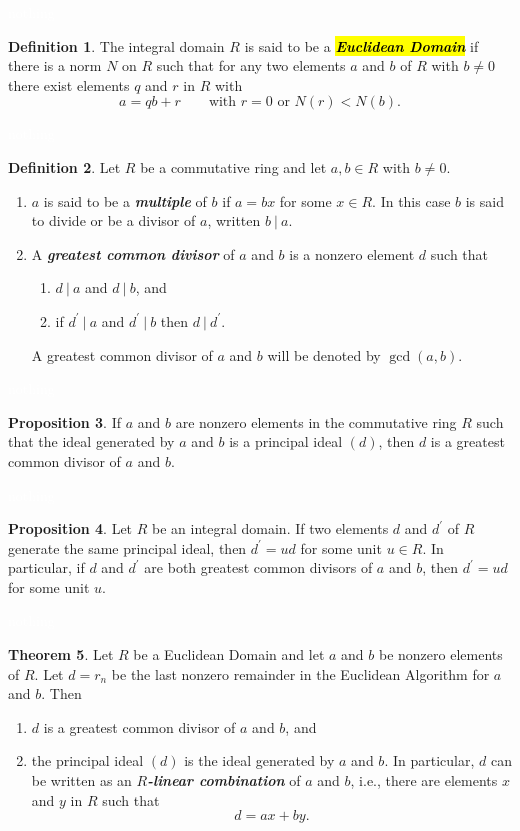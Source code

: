 \documentclass{article}
\theoremstyle{definition}
\newtheorem{thm}{Theorem}[section]
\newtheorem{prop}[thm]{Proposition}
\newtheorem{defn}[thm]{Definition}
\newcommand{\nl}{\textcolor{white}{nothing}}
\newcommand{\p}{\prime}
\begin{document}
\nl

\begin{defn}
The integral domain $R$ is said to be a \hl{\textit{\textbf{Euclidean Domain}}} if there is a norm $N$ on $R$ such that for any two elements $a$ and $b$ of $R$ with $b\neq 0$ there exist elements $q$ and $r$ in $R$ with 
\[a = qb + r\qquad \text{with } r = 0 \text{ or } N(r)<N(b).\]
\end{defn}

\nl

\begin{defn}
Let $R$ be a commutative ring and let $a,b\in R$ with $b\neq 0$.
\begin{enumerate}
\item $a$ is said to be a \textbf{\textit{multiple}} of $b$ if $a = bx$ for some $x\in R$. In this case $b$ is said to divide or be a divisor of $a$, written $b\ |\ a$.
\item A \textbf{\textit{greatest common divisor}} of $a$ and $b$ is a nonzero element $d$ such that 
\begin{enumerate}
\item $d\ |\ a$ and $d\ |\ b$, and 
\item if $d^\p\ |\ a$ and $d^\p\ |\ b$ then $d\ |\ d^\p$.
\end{enumerate}
A greatest common divisor of $a$ and $b$ will be denoted by $\gcd(a,b)$.
\end{enumerate}
\end{defn}

\nl

\begin{prop}
If $a$ and $b$ are nonzero elements in the commutative ring $R$ such that the ideal generated by $a$ and $b$ is a principal ideal $(d)$, then $d$ is a greatest common divisor of $a$ and $b$.
\end{prop}

\nl

\begin{prop}
Let $R$ be an integral domain. If two elements $d$ and $d^\p$ of $R$ generate the same principal ideal, then $d^\p = ud$ for some unit $u\in R$. In particular, if $d$ and $d^\p$ are both greatest common divisors of $a$ and $b$, then $d^\p = ud$ for some unit $u$.
\end{prop}

\nl

\begin{thm}
Let $R$ be a Euclidean Domain and let $a$ and $b$ be nonzero elements of $R$. Let $d = r_n$ be the last nonzero remainder in the Euclidean Algorithm for $a$ and $b$. Then
\begin{enumerate}
\item $d$ is a greatest common divisor of $a$ and $b$, and 
\item the principal ideal $(d)$ is the ideal generated by $a$ and $b$. In particular, $d$ can be written as an $R$\textbf{\textit{-linear combination}} of $a$ and $b$, i.e., there are elements $x$ and $y$ in $R$ such that 
\[d = ax + by.\]
\end{enumerate}
\end{thm}
\end{document}
